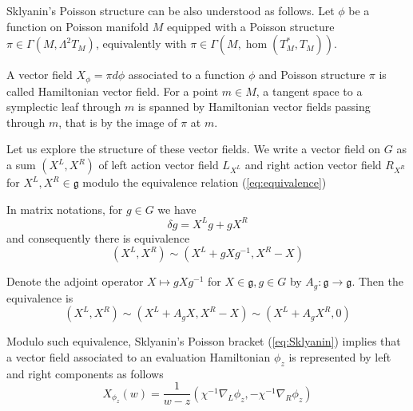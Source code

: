 \documentclass[11pt, oneside, reqno]{amsart}
\theoremstyle{definition} \newtheorem{definition}{Definition}[section]
\theoremstyle{definition} \newtheorem{remark}[definition]{Remark}
\theoremstyle{definition} \newtheorem{remarks}[definition]{Remarks}
\theoremstyle{definition} \newtheorem{question}[definition]{Question}
\theoremstyle{definition} \newtheorem*{note}{Note}
\theoremstyle{definition} \newtheorem{example}[definition]{Example}
\theoremstyle{definition} \newtheorem{examples}[definition]{Examples}
\renewcommand{\gg}{\mathfrak{g}}
\begin{document}
Sklyanin's Poisson structure can be also understood as follows. Let $\phi$ be a function
on Poisson manifold $M$ equipped with a Poisson structure $\pi \in \Gamma(M,\Lambda^2 T_{M})$,
equivalently with $\pi \in \Gamma(M, \hom (T_{M}^{*}, T_{M}))$. 

A vector field $X_{\phi} = \pi d \phi $ associated to a function $\phi$ and Poisson structure $\pi$ is called Hamiltonian vector field. For a point $m \in M$, a tangent space to a symplectic
leaf through $m$ is spanned by Hamiltonian vector fields passing through $m$, 
that is by the image of $\pi$ at $m$.







Let us explore the structure of these vector fields. We write a vector field on $G$
as a sum  $(X^L, X^R)$  of left action vector field $L_{X^L}$ and right action vector field $R_{X^R}$
for $X^L, X^R \in \gg$ modulo the equivalence relation (\ref{eq:equivalence})

In matrix notations, for $g \in G$ we have
\begin{equation}
  \delta g = X^L g + g X^R 
\end{equation}
and consequently there is equivalence 
\begin{equation}
\label{eq:equivalence0}
  (X^L, X^R) \sim (X^L + g X g^{-1}, X^R -  X)
\end{equation}

Denote the adjoint operator $X \mapsto g X g^{-1}$ for $X \in \gg, g \in G$ by $A_{g}: \gg \to \gg$.
Then the equivalence is
\begin{equation}
\label{eq:equivalence}
    (X^L, X^R) \sim (X^L + A_{g} X , X^{R} -  X) \sim (X^{L} +  A_{g} X^{R}, 0) 
\end{equation}


Modulo such equivalence, Sklyanin's Poisson bracket (\ref{eq:Sklyanin}) implies
that a vector field associated to an evaluation Hamiltonian $\phi_z$ is represented by
left and right components as follows 
\begin{equation}
\label{eq:Xphiz}
X_{\phi_z} (w) =  \frac{1}{w - z} ( \chi^{-1} \nabla_{L} \phi_z,  - \chi^{-1}\nabla_{R} \phi_{z})
\end{equation}
\end{document}
